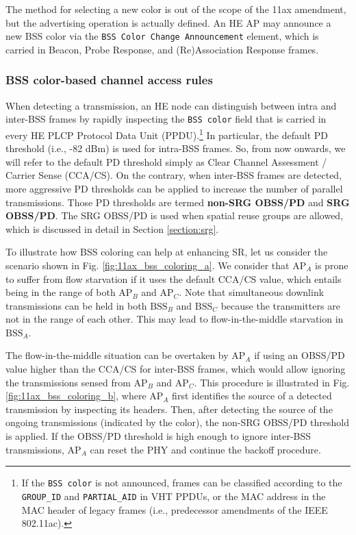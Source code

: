 \documentclass{article}
\begin{document}
The method for selecting a new color is out of the scope of the 11ax amendment, but the advertising operation is actually defined. An HE AP may announce a new BSS color via the \texttt{BSS Color Change Announcement} element, which is carried in Beacon, Probe Response, and (Re)Association Response frames. 

\subsubsection{BSS color-based channel access rules}
\label{section:bss_color_channel_access}
When detecting a transmission, an HE node can distinguish between intra and inter-BSS frames by rapidly inspecting the \texttt{BSS color} field that is carried in every HE PLCP Protocol Data Unit (PPDU).\footnote{If the \texttt{BSS color} is not announced, frames can be classified according to the \texttt{GROUP\_ID} and \texttt{PARTIAL\_AID} in VHT PPDUs, or the MAC address in the MAC header of legacy frames (i.e., predecessor amendments of the IEEE 802.11ac).} In particular, the default PD threshold (i.e., -82 dBm) is used for intra-BSS frames. So, from now onwards, we will refer to the default PD threshold simply as Clear Channel Assessment / Carrier Sense (CCA/CS). On the contrary, when inter-BSS frames are detected, more aggressive PD thresholds can be applied to increase the number of parallel transmissions. Those PD thresholds are termed \textbf{non-SRG OBSS/PD} and \textbf{SRG OBSS/PD}. The SRG OBSS/PD is used when spatial reuse groups are allowed, which is discussed in detail in Section \ref{section:srg}.

To illustrate how BSS coloring can help at enhancing SR, let us consider the scenario shown in Fig. \ref{fig:11ax_bss_coloring_a}. We consider that $\text{AP}_{A}$ is prone to suffer from flow starvation if it uses the default CCA/CS value, which entails being in the range of both $\text{AP}_B$ and $\text{AP}_C$. Note that simultaneous downlink transmissions can be held in both $\text{BSS}_B$ and $\text{BSS}_C$ because the transmitters are not in the range of each other. This may lead to flow-in-the-middle starvation in $\text{BSS}_A$. 

The flow-in-the-middle situation can be overtaken by $\text{AP}_{A}$ if using an OBSS/PD value higher than the CCA/CS for inter-BSS frames, which would allow ignoring the transmissions sensed from $\text{AP}_B$ and $\text{AP}_C$. This procedure is illustrated in Fig. \ref{fig:11ax_bss_coloring_b}, where $\text{AP}_A$ first identifies the source of a detected transmission by inspecting its headers. Then, after detecting the source of the ongoing transmissions (indicated by the color), the non-SRG OBSS/PD threshold is applied. If the OBSS/PD threshold is high enough to ignore inter-BSS transmissions, $\text{AP}_A$ can reset the PHY and continue the backoff procedure.
\end{document}

